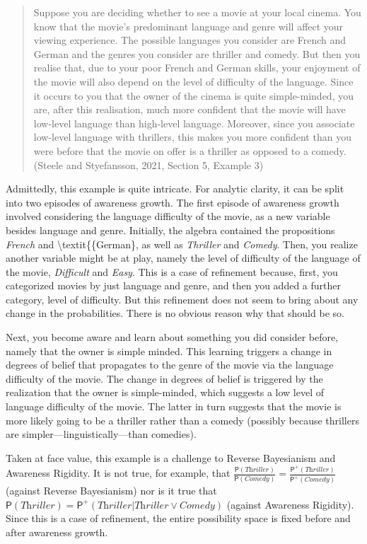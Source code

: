 \documentclass[
  11pt,
  dvipsnames,enabledeprecatedfontcommands]{scrartcl}
\newcommand{\pr}[1]{\ensuremath{\mathsf{P}(#1)}}
\newcommand{\ppr}[2]{\ensuremath{\mathsf{P}^{#1}(#2)}}
\begin{document}
\begin{quote}
Suppose you are deciding whether to see a movie at your local cinema.
You know that the movie's predominant language and genre will affect
your viewing experience. The possible languages you consider are French
and German and the genres you consider are thriller and comedy. But then
you realise that, due to your poor French and German skills, your
enjoyment of the movie will also depend on the level of difficulty of
the language. Since it occurs to you that the owner of the cinema is
quite simple-minded, you are, after this realisation, much more
confident that the movie will have low-level language than high-level
language. Moreover, since you associate low-level language with
thrillers, this makes you more confident than you were before that the
movie on offer is a thriller as opposed to a comedy. (Steele and
Styefansson, 2021, Section 5, Example 3)
\end{quote}

Admittedly, this example is quite intricate. For analytic clarity, it
can be split into two episodes of awareness growth. The first episode of
awareness growth involved considering the language difficulty of the
movie, as a new variable besides language and genre. Initially, the
algebra contained the propositions \textit{French} and
\textbackslash textit\{\{German\}, as well as \textit{Thriller} and
\textit{Comedy}. Then, you realize another variable might be at play,
namely the level of difficulty of the language of the movie,
\textit{Difficult} and \textit{Easy}. This is a case of refinement
because, first, you categorized movies by just language and genre, and
then you added a further category, level of difficulty. But this
refinement does not seem to bring about any change in the probabilities.
There is no obvious reason why that should be so.

Next, you become aware and learn about something you did consider
before, namely that the owner is simple minded. This learning triggers a
change in degrees of belief that propagates to the genre of the movie
via the language difficulty of the movie. The change in degrees of
belief is triggered by the realization that the owner is simple-minded,
which suggests a low level of language difficulty of the movie. The
latter in turn suggests that the movie is more likely going to be a
thriller rather than a comedy (possibly because thrillers are
simpler---linguistically---than comedies).

Taken at face value, this example is a challenge to Reverse Bayesianism
and Awareness Rigidity. It is not true, for example, that
\(\frac{\pr{\textit{Thriller}}}{\pr{\textit{Comedy}}}=\frac{\ppr{+}{\textit{Thriller}}}{\ppr{+}{\textit{Comedy}}}\)
(against Reverse Bayesianism) nor is it true that
\(\pr{\textit{Thriller}}=\ppr{+}{\textit{Thriller} \vert \textit{Thriller}\vee \textit{Comedy}}\)
(against Awareness Rigidity). Since this is a case of refinement, the
entire possibility space is fixed before and after awareness growth.
\end{document}
